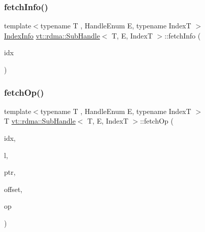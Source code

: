 \mbox{\label{structvt_1_1rdma_1_1_sub_handle_a98a57c00dcd4b2311937a1af439c10b1}} 
\subsubsection{\texorpdfstring{fetch\+Info()}{fetchInfo()}}
{\footnotesize\ttfamily template$<$typename T , Handle\+Enum E, typename IndexT $>$ \\
\hyperlink{structvt_1_1rdma_1_1_index_info}{Index\+Info} \hyperlink{structvt_1_1rdma_1_1_sub_handle}{vt\+::rdma\+::\+Sub\+Handle}$<$ T, E, IndexT $>$\+::fetch\+Info (\begin{DoxyParamCaption}\item[{IndexT const \&}]{idx }\end{DoxyParamCaption})}

\mbox{\label{structvt_1_1rdma_1_1_sub_handle_aeb76a6664bacfc5ee129866923412c5c}} 
\subsubsection{\texorpdfstring{fetch\+Op()}{fetchOp()}}
{\footnotesize\ttfamily template$<$typename T , Handle\+Enum E, typename IndexT $>$ \\
T \hyperlink{structvt_1_1rdma_1_1_sub_handle}{vt\+::rdma\+::\+Sub\+Handle}$<$ T, E, IndexT $>$\+::fetch\+Op (\begin{DoxyParamCaption}\item[{IndexT const \&}]{idx,  }\item[{\hyperlink{namespacevt_1_1rdma_ac5c20b41a653e520b6305d4d454ecb70}{Lock}}]{l,  }\item[{T}]{ptr,  }\item[{int}]{offset,  }\item[{M\+P\+I\+\_\+\+Op}]{op }\end{DoxyParamCaption})}

\mbox{\label{structvt_1_1rdma_1_1_sub_handle_ad470ab848b32d8d857229d7fa1ac0e22}} 
